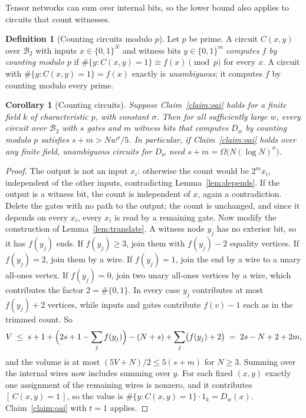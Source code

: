 \documentclass[11pt]{article}
\newtheorem{corollary}[theorem]{Corollary}
\theoremstyle{definition}
\newtheorem{definition}[theorem]{Definition}
\newcommand{\Dw}{D_w}
\newcommand{\B}{\mathcal{B}_2}
\begin{document}
Tensor networks can sum over internal bits, so the lower bound also applies to circuits that count witnesses.

\begin{definition}[Counting circuits modulo $p$]
Let $p$ be prime. A circuit $C(x,y)$ over $\B$ with inputs $x\in\{0,1\}^N$ and witness bits $y\in\{0,1\}^m$ \emph{computes $f$ by counting modulo $p$} if $\#\{y: C(x,y)=1\}\equiv f(x)\pmod p$ for every $x$. A circuit with $\#\{y:C(x,y)=1\} = f(x)$ exactly is \emph{unambiguous}; it computes $f$ by counting modulo every prime.
\end{definition}

\begin{corollary}[Counting circuits]\label{cor:count}
Suppose Claim~\ref{claim:oai} holds for a finite field $k$ of characteristic $p$, with constant $\sigma$. Then for all sufficiently large $w$, every circuit over $\B$ with $s$ gates and $m$ witness bits that computes $\Dw$ by counting modulo $p$ satisfies $s+m > N w^{\sigma}/5$. In particular, if Claim~\ref{claim:oai} holds over any finite field, unambiguous circuits for $\Dw$ need $s+m = \Omega\bigl(N(\log N)^{\sigma}\bigr)$.
\end{corollary}

\begin{proof}
The output is not an input $x_i$: otherwise the count would be $2^m x_i$, independent of the other inputs, contradicting Lemma~\ref{lem:depends}. If the output is a witness bit, the count is independent of $x$, again a contradiction. Delete the gates with no path to the output; the count is unchanged, and since it depends on every $x_i$, every $x_i$ is read by a remaining gate. Now modify the construction of Lemma~\ref{lem:translate}. A witness node $y_j$ has no exterior bit, so it has $f(y_j)$ ends. If $f(y_j)\ge 3$, join them with $f(y_j)-2$ equality vertices. If $f(y_j)=2$, join them by a wire. If $f(y_j)=1$, join the end by a wire to a unary all-ones vertex. If $f(y_j)=0$, join two unary all-ones vertices by a wire, which contributes the factor $2 = \#\{0,1\}$. In every case $y_j$ contributes at most $f(y_j)+2$ vertices, while inputs and gates contribute $f(v)-1$ each as in the trimmed count. So
\[
V \;\le\; s+1+\Bigl(2s+1-\sum_j f(y_j)\Bigr)-(N+s)+\sum_j\bigl(f(y_j)+2\bigr) \;=\; 2s-N+2+2m,
\]
and the volume is at most $(5V+N)/2\le 5(s+m)$ for $N\ge 3$. Summing over the internal wires now includes summing over $y$. For each fixed $(x,y)$ exactly one assignment of the remaining wires is nonzero, and it contributes $[\,C(x,y)=1\,]$, so the value is $\#\{y:C(x,y)=1\}\cdot 1_k = \Dw(x)$. Claim~\ref{claim:oai} with $t=1$ applies.
\end{proof}
\end{document}
